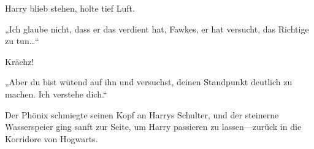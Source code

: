 Harry blieb stehen, holte tief Luft.

„Ich glaube nicht, dass er das verdient hat, Fawkes, er hat versucht, das Richtige zu tun…“

Krächz!

„Aber du bist wütend auf ihn und versuchst, deinen Standpunkt deutlich zu machen. Ich verstehe dich.“

Der Phönix schmiegte seinen Kopf an Harrys Schulter, und der steinerne Wasserspeier ging sanft zur Seite, um Harry passieren zu lassen—zurück in die Korridore von Hogwarts.

